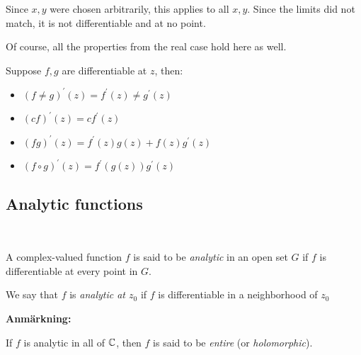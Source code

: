 \noindent Since $x,y$ were chosen arbitrarily, this applies to all $x,y$. Since the limits did not match, it is not differentiable and at no point.
\par\bigskip
\noindent Of course, all the properties from the real case hold here as well.\par
\noindent Suppose $f,g$ are differentiable at $z$, then:\par
\begin{itemize}
  \item $(f\neq g)^{\prime}(z) = f^{\prime}(z)\neq g^{\prime}(z)$
  \item $(cf)^{\prime}(z) = cf^{\prime}(z)$
  \item $(fg)^{\prime}(z) = f^{\prime}(z)g(z)+f(z)g^{\prime}(z)$
  \item $(f\circ g)^{\prime}(z) = f^{\prime}(g(z))g^{\prime}(z)$
\end{itemize}
\newpage
\subsection{Analytic functions}\hfill\\
\par\bigskip
\begin{theo}{}
  A complex-valued function $f$ is said to be \textit{analytic} in an open set $G$ if $f$ is differentiable at every point in $G$.
  \par\bigskip
  \noindent We say that $f$ is \textit{analytic at $z_0$}  if $f$ is differentiable in a neighborhood of $z_0$
\end{theo}
\par\bigskip
\noindent\textbf{Anmärkning:}\par
\noindent If $f$ is analytic in all of $\mathbb{C}$, then $f$ is said to be \textit{entire} (or \textit{holomorphic}).
